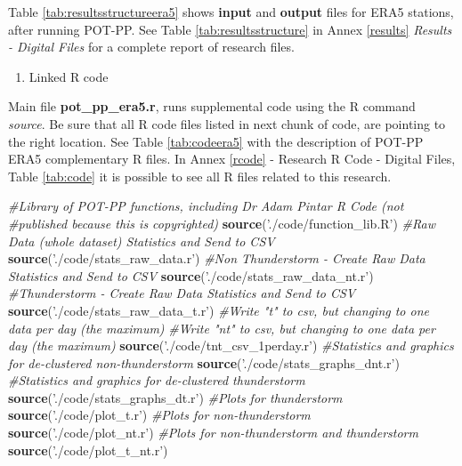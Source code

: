 \documentclass[12pt,oneside]{reedthesis}
\newenvironment{Shaded}{\begin{snugshade}}{\end{snugshade}}
\newcommand{\CommentTok}[1]{\textcolor[rgb]{0.56,0.35,0.01}{\textit{#1}}}
\newcommand{\KeywordTok}[1]{\textcolor[rgb]{0.13,0.29,0.53}{\textbf{#1}}}
\newcommand{\NormalTok}[1]{#1}
\newcommand{\StringTok}[1]{\textcolor[rgb]{0.31,0.60,0.02}{#1}}
\providecommand{\tightlist}{%
  \setlength{\itemsep}{0pt}\setlength{\parskip}{0pt}}
\begin{document}
Table \ref{tab:resultsstructureera5} shows \textbf{input} and \textbf{output} files for ERA5 stations, after running POT-PP. See Table \ref{tab:resultsstructure} in Annex \ref{results} \emph{Results - Digital Files} for a complete report of research files.
\begin{enumerate}
\def\labelenumi{\arabic{enumi}.}
\setcounter{enumi}{2}
\tightlist
\item
  Linked R code
\end{enumerate}
Main file \textbf{pot\_pp\_era5.r}, runs supplemental code using the R command \emph{source}. Be sure that all R code files listed in next chunk of code, are pointing to the right location. See Table \ref{tab:codeera5} with the description of POT-PP ERA5 complementary R files. In Annex \ref{rcode} - Research R Code - Digital Files, Table \ref{tab:code} it is possible to see all R files related to this research.

\scriptsize

\vspace{0.4cm}
\begin{Shaded}
\begin{Highlighting}[]
    \CommentTok{#Library of POT-PP functions, including Dr Adam Pintar R Code (not }
    \CommentTok{#published because this is copyrighted)}
      \KeywordTok{source}\NormalTok{(}\StringTok{'./code/function_lib.R'}\NormalTok{)}
    \CommentTok{#Raw Data (whole dataset) Statistics and Send to CSV }
      \KeywordTok{source}\NormalTok{(}\StringTok{'./code/stats_raw_data.r'}\NormalTok{)}
    \CommentTok{#Non Thunderstorm - Create Raw Data Statistics and Send to CSV }
      \KeywordTok{source}\NormalTok{(}\StringTok{'./code/stats_raw_data_nt.r'}\NormalTok{)}
    \CommentTok{#Thunderstorm - Create Raw Data Statistics and Send to CSV}
      \KeywordTok{source}\NormalTok{(}\StringTok{'./code/stats_raw_data_t.r'}\NormalTok{)}
    \CommentTok{#Write "t" to csv, but changing to one data per day (the maximum)}
    \CommentTok{#Write "nt" to csv, but changing to one data per day (the maximum)}
      \KeywordTok{source}\NormalTok{(}\StringTok{'./code/tnt_csv_1perday.r'}\NormalTok{)}
    \CommentTok{#Statistics and graphics for de-clustered non-thunderstorm}
      \KeywordTok{source}\NormalTok{(}\StringTok{'./code/stats_graphs_dnt.r'}\NormalTok{)}
    \CommentTok{#Statistics and graphics for de-clustered thunderstorm}
      \KeywordTok{source}\NormalTok{(}\StringTok{'./code/stats_graphs_dt.r'}\NormalTok{)}
    \CommentTok{#Plots for thunderstorm}
      \KeywordTok{source}\NormalTok{(}\StringTok{'./code/plot_t.r'}\NormalTok{)}
    \CommentTok{#Plots for non-thunderstorm}
      \KeywordTok{source}\NormalTok{(}\StringTok{'./code/plot_nt.r'}\NormalTok{)}
    \CommentTok{#Plots for non-thunderstorm and thunderstorm}
      \KeywordTok{source}\NormalTok{(}\StringTok{'./code/plot_t_nt.r'}\NormalTok{)}
\end{Highlighting}
\end{Shaded}
\normalsize


\end{document}
